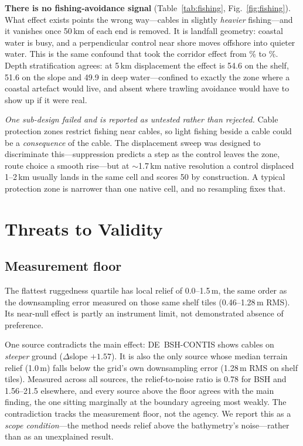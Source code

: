 \documentclass[journal]{IEEEtran}
\begin{document}
\textbf{There is no fishing-avoidance signal} (Table~\ref{tab:fishing},
Fig.~\ref{fig:fishing}). What effect exists points the wrong way---cables in
slightly \emph{heavier} fishing---and it vanishes once 50\,km of each end is
removed. It is landfall geometry: coastal water is busy, and a perpendicular
control near shore moves offshore into quieter water. This is the same confound
that took the corridor effect from \nCorridorRaw\% to \nCorridorCtl\%. Depth
stratification agrees: at 5\,km displacement the effect is 54.6 on the shelf,
51.6 on the slope and 49.9 in deep water---confined to exactly the zone where a
coastal artefact would live, and absent where trawling avoidance would have to
show up if it were real.

\emph{One sub-design failed and is reported as untested rather than rejected.}
Cable protection zones restrict fishing near cables, so light fishing beside a
cable could be a \emph{consequence} of the cable. The displacement sweep was
designed to discriminate this---suppression predicts a step as the control
leaves the zone, route choice a smooth rise---but at $\sim$1.7\,km native
resolution a control displaced 1--2\,km usually lands in the same cell and
scores 50 by construction. A typical protection zone is narrower than one
native cell, and no resampling fixes that.

\section{Threats to Validity}\label{sec:threats}

\subsection{Measurement floor}
The flattest ruggedness quartile has local relief of 0.0--1.5\,m, the same
order as the downsampling error measured on those same shelf tiles
(0.46--1.28\,m RMS). Its near-null effect is partly an instrument limit, not
demonstrated absence of preference.

One source contradicts the main effect: DE~BSH-CONTIS shows cables on
\emph{steeper} ground ($\Delta$slope $+1.57$). It is also the only source whose
median terrain relief (1.0\,m) falls below the grid's own downsampling error
(1.28\,m RMS on shelf tiles). Measured across all sources, the
relief-to-noise ratio is 0.78 for BSH and 1.56--21.5 elsewhere, and every
source above the floor agrees with the main finding, the one sitting marginally
at the boundary agreeing most weakly. The contradiction tracks the measurement
floor, not the agency. We report this as a \emph{scope condition}---the method
needs relief above the bathymetry's noise---rather than as an unexplained
result.
\end{document}
